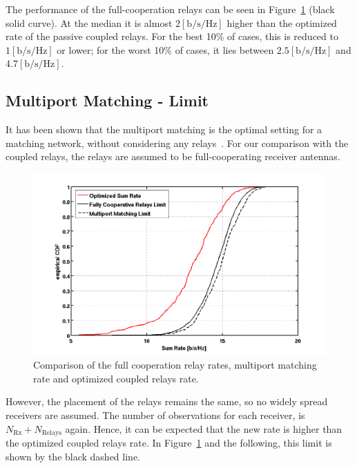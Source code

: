 The performance of the full-cooperation relays can be seen in Figure~\ref{fig:limcomparison} (black solid curve).
At the median it is almost $2 \left[\text{b/s/Hz}\right]$ higher than the optimized rate of the passive coupled relays.
For the best 10\% of cases, this is reduced to $1 \left[\text{b/s/Hz}\right]$ or lower;
for the worst 10\% of cases, it lies between  $2.5 \left[\text{b/s/Hz}\right]$ and $4.7 \left[\text{b/s/Hz}\right]$.


\subsection{Multiport Matching - Limit}
\label{sec:mp_limit}
It has been shown that the multiport matching is the optimal setting for a matching network, without considering any relays~\cite{Nossek}.
For our comparison with the coupled relays, the relays are assumed to be full-cooperating receiver antennas.
\begin{figure}[h]
\centering
  \includegraphics[width=0.9\linewidth]{images/Limitcomparison.png}
\caption{Comparison of the full cooperation relay rates, multiport matching rate and optimized coupled relays rate.}
\label{fig:limcomparison}
\end{figure}
However, the placement of the relays remains the same, so no widely spread receivers are assumed.
The number of observations for each receiver, is $N_\text{Rx} + N_\text{Relays}$ again.
Hence, it can be expected that the new rate is higher than the optimized coupled relays rate.
In Figure~\ref{fig:limcomparison} and the following, this limit is shown by the black dashed line.

